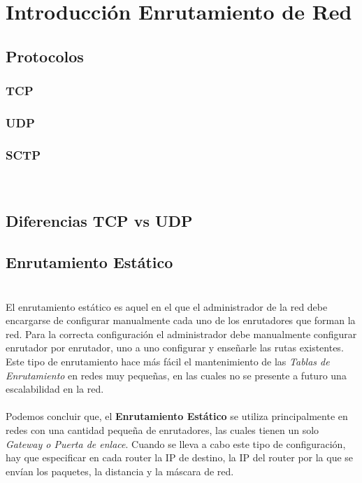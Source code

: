 \documentclass[a4paper]{report} %
\begin{document}
        \section{Introducción Enrutamiento de Red}
          \subsection{Protocolos}
            \subsubsection{TCP}
            \subsubsection{UDP}
            \subsubsection{SCTP}
              \paragraph{}\mbox{} \\
          \subsection{Diferencias TCP vs UDP}
          \subsection{Enrutamiento Estático}
            \paragraph{}\mbox{} \\
              El enrutamiento estático es aquel en el que el administrador de la red debe encargarse de configurar manualmente cada uno de los enrutadores que forman la red. Para la correcta configuración el administrador debe manualmente configurar enrutador por enrutador, uno a uno configurar y enseñarle las rutas existentes.
              \\Este tipo de enrutamiento hace más fácil el mantenimiento de las \textit{Tablas de Enrutamiento} en redes muy pequeñas, en las cuales no se presente a futuro una escalabilidad en la red.
              \\\\Podemos concluir que, el \textbf{Enrutamiento Estático} se utiliza principalmente en redes con una cantidad pequeña de enrutadores, las cuales tienen un solo \textit{Gateway o Puerta de enlace}. Cuando se lleva a cabo este tipo de configuración, hay que especificar en cada router la IP de destino, la IP del router por la que se envían los paquetes, la distancia y la máscara de red.
\end{document}
